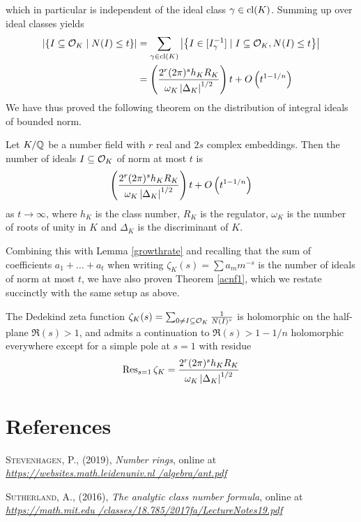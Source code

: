 \documentclass[11pt]{report}
\begin{document}
which in particular is independent of the ideal class $\gamma \in \operatorname{cl}(K)$. Summing up over ideal classes yields
\begin{align*}
    \left| \left\{  I \subseteq \mathcal{O}_K \mid N(I) \leq t  \right\} \right| &= \sum_{\gamma \in \operatorname{cl}(K)}\left| \left\{  I \in [I_{\gamma}^{-1}] \mid I \subseteq \mathcal{O}_K, N(I) \leq t  \right\} \right| \\ 
    &= \left(  \frac{2^r(2\pi)^s h_KR_K}{\omega_K \left| \Delta_K \right|^{1/2}}  \right)t + O\left(  t^{1 - 1/n}  \right)
\end{align*}
We have thus proved the following theorem on the distribution of integral ideals of bounded norm.
\begin{theorem}[]
    Let $K / \mathbb{Q}$ be a number field with $r$ real and $2s$ complex embeddings. Then the number of ideals $I \subseteq \mathcal{O}_K$ of norm at most $t$ is
    $$
        \left(  \frac{2^r(2\pi)^s h_KR_K}{\omega_K\left| \Delta_K \right|^{1/2}}  \right)t + O\left(  t^{1 - 1/n}  \right)
    $$
    as $t \to \infty$, where $h_K$ is the class number, $R_K$ is the regulator, $\omega_K$ is the number of roots of unity in $K$ and $\Delta_K$ is the discriminant of $K$.
\end{theorem}
Combining this with Lemma \ref{growthrate} and recalling that the sum of coefficients $a_1 + \ldots + a_t$ when writing $\zeta_K(s) = \sum a_mm^{-s}$ is the number of ideals of norm at most $t$, we have also proven Theorem \ref{acnf1}, which we restate succinctly with the same setup as above.
\begin{theorem}
    The Dedekind zeta function $\zeta_K(s) = \sum_{0 \neq I \subseteq \mathcal{O}_K} \frac{1}{N(I)^s}$ is holomorphic on the half-plane $\Re(s) > 1$, and admits a continuation to $\Re(s) > 1 - 1/n$ holomorphic everywhere except for a simple pole at $s = 1$ with residue
    $$
        \operatorname{Res}_{s = 1}\zeta_K = \frac{2^r(2\pi)^sh_KR_K}{\omega_K\left| \Delta_K \right|^{1/2}}
    $$
\end{theorem}

\chapter{References}
\begin{enum}
    \item \hypertarget{stevenhagen}{\textsc{Stevenhagen, P.}, (2019), \emph{Number rings}, online at \emph{\color{blue}\href{https://websites.math.leidenuniv.nl/algebra/ant.pdf}{https://websites.math.leidenuniv.nl /algebra/ant.pdf}\color{black}}}
    \item \hypertarget{sutherland}{\textsc{Sutherland, A.}, (2016), \emph{The analytic class number formula}, online at \emph{\color{blue}\href{https://math.mit.edu/classes/18.785/2017fa/LectureNotes19.pdf}{https://math.mit.edu /classes/18.785/2017fa/LectureNotes19.pdf}\color{black}}}
\end{enum}
\end{document}
